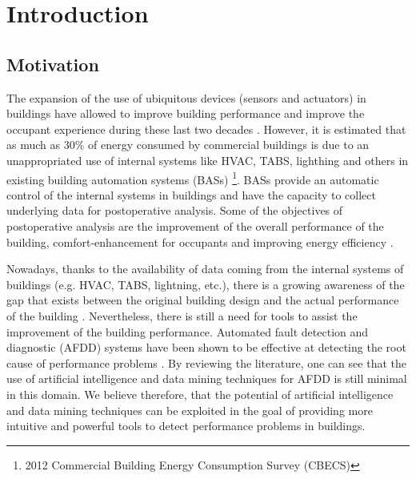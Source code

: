\chapter{Introduction} %
\label{Chapter1} %
\minitoc

\newcommand{\keyword}[1]{\textbf{#1}}
\newcommand{\tabhead}[1]{\textbf{#1}}
\newcommand{\code}[1]{\texttt{#1}}
\newcommand{\file}[1]{\texttt{\bfseries#1}}
\newcommand{\option}[1]{\texttt{\itshape#1}}


\section{Motivation}

The expansion of the use of ubiquitous devices (sensors and actuators) in buildings have allowed to improve building performance and improve the occupant experience during these last two decades \cite{de2017occupancy,abdallah2015developing,dong2009sensor}. However, it is estimated that as much as 30\% of energy consumed by commercial buildings is due to an unappropriated use of internal systems like HVAC, TABS, lighthing and others in existing building automation systems (BASs) \footnote{2012 Commercial Building Energy Consumption Survey (CBECS)}. BASs provide an automatic control of the internal systems in buildings and have the capacity to collect underlying data for postoperative analysis. Some of the objectives of postoperative analysis are the improvement of the overall performance of the building, comfort-enhancement for occupants and improving energy efficiency  \cite{miller2015automated,capozzoli2015fault}.


Nowadays, thanks to the availability of data coming from the internal systems of buildings (e.g. HVAC, TABS,
lightning, etc.), there is a growing awareness of the gap that exists between the original building design and the actual performance of the building \cite{miller2015automated}. Nevertheless, there is still a need for tools to assist the improvement of the building performance. Automated fault detection and diagnostic (AFDD) systems have been shown to be effective at detecting the root cause of performance problems \cite{kim2017review}. By reviewing the literature, one can see that the use of artificial intelligence and data mining techniques for AFDD \cite{capozzoli2015fault} is still minimal in this domain. We believe therefore, that the potential of artificial intelligence and data mining techniques can be exploited in the goal of providing more intuitive and powerful tools to detect performance problems in buildings.    


